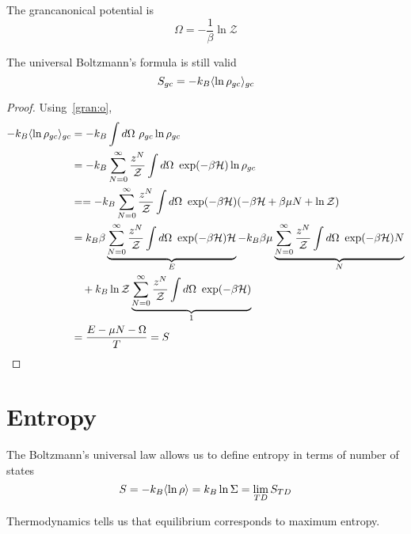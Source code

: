     The grancanonical potential is 
    \begin{equation}\label{gran:o}
        \Omega = - \frac{1}{\beta} \ln \mathcal Z
    \end{equation}

    The universal Boltzmann's formula is still valid
    \begin{equation*}
        S_{gc} = -k_B \langle\ln \rho_{gc}\rangle_{gc} 
    \end{equation*}

    \begin{proof}
        Using~\eqref{gran:o},
        \begin{equation*}
        \begin{aligned}
            -k_B \langle\ln \rho_{gc}\rangle_{gc} & = -k_B \int d\Omega ~ \rho_{gc} \ln \rho_{gc} \\ & = -k_B \sum_{N=0}^{\infty} \frac{z^N}{\mathcal Z} \int d\Omega ~ \exp(- \beta \mathcal H) \ln \rho_{gc} \\ & = = -k_B \sum_{N=0}^{\infty} \frac{z^N}{\mathcal Z} \int d\Omega ~ \exp(- \beta \mathcal H) (- \beta \mathcal H + \beta \mu N + \ln \mathcal Z) \\ & = k_B \beta \underbrace{\sum_{N=0}^{\infty} \frac{z^N}{\mathcal Z} \int d\Omega ~ \exp(-\beta \mathcal H) \mathcal H}_{E} - k_B \beta \mu \underbrace{\sum_{N=0}^{\infty} \frac{z^N}{\mathcal Z} \int d\Omega ~ \exp(-\beta \mathcal H) N}_{N} \\ & \quad + k_B \ln \mathcal Z \underbrace{\sum_{N=0}^{\infty} \frac{z^N}{\mathcal Z} \int d\Omega ~ \exp(-\beta \mathcal H)}_{1} \\ & = \frac{E - \mu N - \Omega}{T} = S
        \end{aligned}
        \end{equation*}
    \end{proof}

\chapter{Entropy}

    The Boltzmann's universal law allows us to define entropy in terms of number of states
    \begin{equation*}
        S = - k_B \langle\ln \rho\rangle = k_B \ln \Sigma = \lim_{TD} S_{TD}
    \end{equation*}

    Thermodynamics tells us that equilibrium corresponds to maximum entropy.

